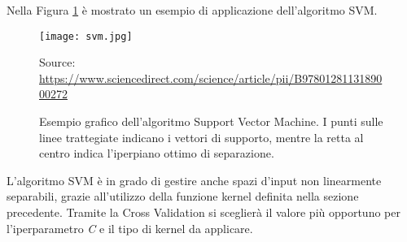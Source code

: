 Nella Figura \ref{fig:svm} è mostrato un esempio di applicazione dell'algoritmo SVM.
\begin{figure}[h]
	\begin{center}
		\texttt{[image: svm.jpg]}
		\caption{Esempio grafico dell'algoritmo Support Vector Machine. I punti sulle linee trattegiate indicano i vettori di supporto, mentre la retta al centro indica l'iperpiano ottimo di separazione.
		} 
		Source: \url{https://www.sciencedirect.com/science/article/pii/B9780128113189000272}\label{fig:svm}
	\end{center}
\end{figure}
L'algoritmo SVM è in grado di gestire anche spazi d'input non linearmente separabili, grazie all'utilizzo della funzione kernel definita nella sezione precedente. Tramite la Cross Validation si sceglierà il valore più opportuno per l'iperparametro \emph{C} e il tipo di kernel da applicare.

